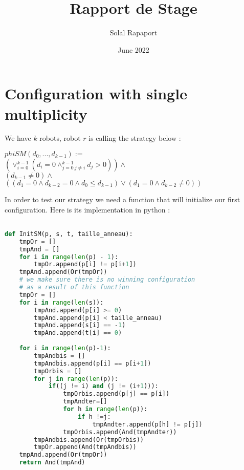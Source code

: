 \documentclass{article}
\title{Rapport de Stage}
\author{Solal Rapaport }
\date{June 2022}
\begin{document}
\maketitle

\section{Configuration with single multiplicity}

We have $k$ robots, robot $r$ is calling the strategy below :
\begin{center}
$phiSM(d_0, ..., d_{k-1}):=$\\
$(\lor_{i=0}^{k-1}(d_i = 0\land_{j=0\ j\not=i}^{k-1} d_j > 0))\land$\\
$(d_{k-1} \not= 0) \land $\\
$((d_1 = 0 \land d_{k-2} = 0 \land d_0 \leq d_{k-1}) \lor (d_1 = 0 \land d_{k-2} \not= 0))$
\end{center}

In order to test our strategy we need a function that will initialize our first configuration. Here is its implementation in python :

\begin{lstlisting}[language=Python]

def InitSM(p, s, t, taille_anneau):
    tmpOr = []
    tmpAnd = []
    for i in range(len(p) - 1):
        tmpOr.append(p[i] != p[i+1])
    tmpAnd.append(Or(tmpOr))
    # we make sure there is no winning configuration
    # as a result of this function
    tmpOr = []
    for i in range(len(s)):
        tmpAnd.append(p[i] >= 0)
        tmpAnd.append(p[i] < taille_anneau)
        tmpAnd.append(s[i] == -1)
        tmpAnd.append(t[i] == 0)
    
    for i in range(len(p)-1):
        tmpAndbis = []
        tmpAndbis.append(p[i] == p[i+1])
        tmpOrbis = []
        for j in range(len(p)):
            if((j != i) and (j != (i+1))):
                tmpOrbis.append(p[j] == p[i])
                tmpAndter=[]
                for h in range(len(p)):
                    if h !=j:
                        tmpAndter.append(p[h] != p[j])
                tmpOrbis.append(And(tmpAndter))
        tmpAndbis.append(Or(tmpOrbis))
        tmpOr.append(And(tmpAndbis))
    tmpAnd.append(Or(tmpOr))
    return And(tmpAnd)
\end{lstlisting}
\end{document}
